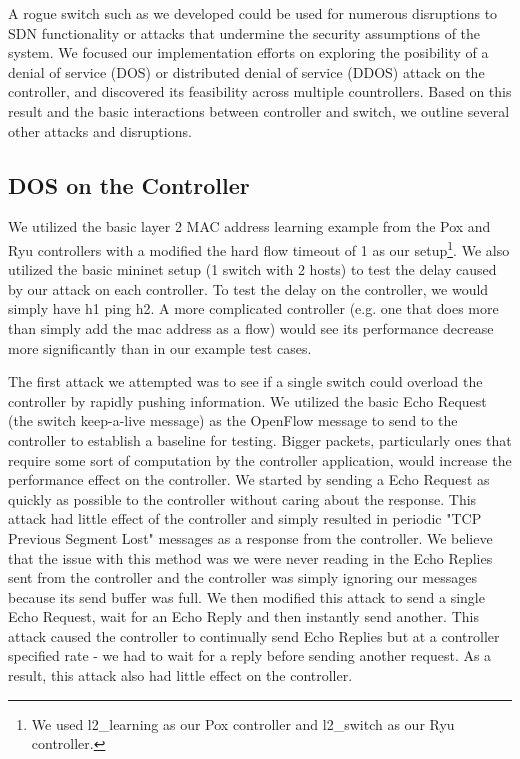 A rogue switch such as we developed could be used for numerous disruptions to SDN functionality or attacks that undermine the security assumptions of the system.  We focused our implementation efforts on exploring the posibility of a denial of service (DOS) or distributed denial of service (DDOS) attack on the controller, and discovered its feasibility across multiple countrollers.  Based on this result and the basic interactions between controller and switch, we outline several other attacks and disruptions. 

\subsection{DOS on the Controller}
We utilized the basic layer 2 MAC address learning example from the Pox and Ryu controllers with a modified the hard flow timeout of 1 as our setup\footnote{We used l2\_learning as our Pox controller and l2\_switch as our Ryu controller.}. We also utilized the basic mininet setup (1 switch with 2 hosts) to test the delay caused by our attack on each controller. To test the delay on the controller, we would simply have h1 ping h2. A more complicated controller (e.g. one that does more than simply add the mac address as a flow) would see its performance decrease more significantly than in our example test cases.

 The first attack we attempted was to see if a single switch could overload the controller by rapidly pushing information. We utilized the basic Echo Request (the switch keep-a-live message) as the OpenFlow message to send to the controller to establish a baseline for testing. Bigger packets, particularly ones that require some sort of computation by the controller application, would increase the performance effect on the controller. We started by sending a Echo Request as quickly as possible to the controller without caring about the response. This attack had little effect of the controller and simply resulted in periodic "TCP Previous Segment Lost" messages as a response from the controller. We believe that the issue with this method was we were never reading in the Echo Replies sent from the controller and the controller was simply ignoring our messages because its send buffer was full. We then modified this attack to send a single Echo Request, wait for an Echo Reply and then instantly send another. This attack caused the controller to continually send Echo Replies but at a controller specified rate - we had to wait for a reply before sending another request. As a result, this attack also had little effect on the controller.

